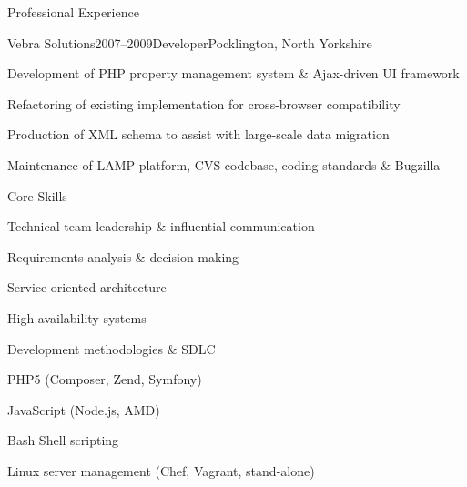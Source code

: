 \documentclass{cv}
\begin{document}
\begin{rSection}{Professional Experience}
\begin{rSubsection}{Vebra Solutions}{2007--2009}{Developer}{Pocklington, North Yorkshire}
\item Development of PHP property management system \& Ajax-driven UI framework
\item Refactoring of existing implementation for cross-browser compatibility
\item Production of XML schema to assist with large-scale data migration
\item Maintenance of LAMP platform, CVS codebase, coding standards \& Bugzilla
\end{rSubsection}

\end{rSection}


\begin{rSection}{Core Skills}

\begin{rSubsection}{}{}{}{}
\item Technical team leadership \& influential communication
\item Requirements analysis \& decision-making
\item Service-oriented architecture
\item High-availability systems
\item Development methodologies \& SDLC
\item PHP5 (Composer, Zend, Symfony)
\item JavaScript (Node.js, AMD)
\item Bash Shell scripting
\item Linux server management (Chef, Vagrant, stand-alone)
\end{rSubsection}

\end{rSection}

\end{document}
